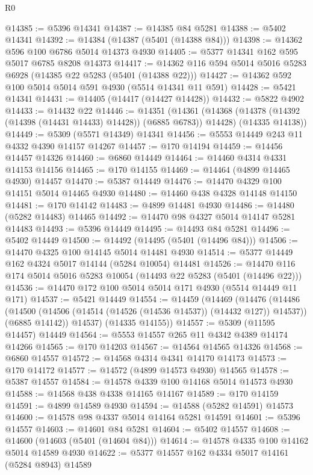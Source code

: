 \begin{lexlean}{R0}
\begin{coremodule}
@14385 := @5396 @14341
@14387 := @14385 @84 @5281
@14388 := @5402 @14341
@14392 := @14384 (@14387 (@5401 (@14388 @84)))
@14398 := @14362 @596 @100 @6786 @5014 @14373 @4930
@14405 := @5377 @14341 @162 @595 @5017 @6785 @8208 @14373
@14417 := @14362 @116 @594 @5014 @5016 @5283 @6928 (@14385 @22 @5283 (@5401 (@14388 @22)))
@14427 := @14362 @592 @100 @5014 @5014 @591 @4930 (@5514 @14341 @11 @591)
@14428 := @5421 @14341
@14431 := @14405 (@14417 (@14427 @14428))
@14432 := @5822 @4902
@14433 := @14432 @22
@14446 := @14351
    (@14361
      (@14368 (@14378 (@14392 (@14398 (@14431 @14433) @14428)) (@6885 @6783)) @14428)
      (@14335 @14138))
@14449 := @5309 (@5571 @14349) @14341
@14456 := @5553 @14449 @243 @11 @4332 @4390 @14157 @14267
@14457 := @170 @14194
@14459 := @14456 @14457 @14326
@14460 := @6860 @14449
@14464 := @14460 @4314 @4331 @14153 @14156
@14465 := @170 @14155
@14469 := @14464 (@4899 @14465 @4930) @14457
@14470 := @5387 @14449
@14476 := @14470 @4329 @100 @14151 @5014 @14465 @4930
@14480 := @14460 @438 @4328 @14148 @14150
@14481 := @170 @14142
@14483 := @4899 @14481 @4930
@14486 := @14480 (@5282 @14483) @14465
@14492 := @14470 @98 @4327 @5014 @14147 @5281 @14483
@14493 := @5396 @14449
@14495 := @14493 @84 @5281
@14496 := @5402 @14449
@14500 := @14492 (@14495 (@5401 (@14496 @84)))
@14506 := @14470 @4325 @100 @14145 @5014 @14481 @4930
@14514 := @5377 @14449 @162 @4324 @5017 @14144 (@5284 @10054) @14481
@14526 := @14470 @116 @174 @5014 @5016 @5283 @10054 (@14493 @22 @5283 (@5401 (@14496 @22)))
@14536 := @14470 @172 @100 @5014 @5014 @171 @4930 (@5514 @14449 @11 @171)
@14537 := @5421 @14449
@14554 := @14459
    (@14469
      (@14476
        (@14486
          (@14500 (@14506 (@14514 (@14526 (@14536 @14537)) (@14432 @127)) @14537))
          (@6885 @14142))
        @14537)
      (@14335 @14155))
@14557 := @5309 (@11595 @14457) @14449
@14564 := @5553 @14557 @265 @11 @4342 @4389 @14174 @14266
@14565 := @170 @14203
@14567 := @14564 @14565 @14326
@14568 := @6860 @14557
@14572 := @14568 @4314 @4341 @14170 @14173
@14573 := @170 @14172
@14577 := @14572 (@4899 @14573 @4930) @14565
@14578 := @5387 @14557
@14584 := @14578 @4339 @100 @14168 @5014 @14573 @4930
@14588 := @14568 @438 @4338 @14165 @14167
@14589 := @170 @14159
@14591 := @4899 @14589 @4930
@14594 := @14588 (@5282 @14591) @14573
@14600 := @14578 @98 @4337 @5014 @14164 @5281 @14591
@14601 := @5396 @14557
@14603 := @14601 @84 @5281
@14604 := @5402 @14557
@14608 := @14600 (@14603 (@5401 (@14604 @84)))
@14614 := @14578 @4335 @100 @14162 @5014 @14589 @4930
@14622 := @5377 @14557 @162 @4334 @5017 @14161 (@5284 @8943) @14589

\end{coremodule}
\end{lexlean}
